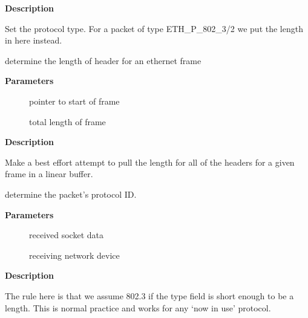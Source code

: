 \documentclass[a4paper,8pt,english]{sphinxmanual}
\begin{document}
\textbf{Description}

Set the protocol type. For a packet of type ETH\_P\_802\_3/2 we put the length
in here instead.

\begin{fulllineitems}
\label{networking/kapi:c.eth_get_headlen}
determine the length of header for an ethernet frame

\end{fulllineitems}


\textbf{Parameters}
\begin{description}
\item[{}] \leavevmode
pointer to start of frame

\item[{}] \leavevmode
total length of frame

\end{description}

\textbf{Description}

Make a best effort attempt to pull the length for all of the headers for
a given frame in a linear buffer.

\begin{fulllineitems}
\label{networking/kapi:c.eth_type_trans}
determine the packet's protocol ID.

\end{fulllineitems}


\textbf{Parameters}
\begin{description}
\item[{}] \leavevmode
received socket data

\item[{}] \leavevmode
receiving network device

\end{description}

\textbf{Description}

The rule here is that we
assume 802.3 if the type field is short enough to be a length.
This is normal practice and works for any `now in use' protocol.
\end{document}

